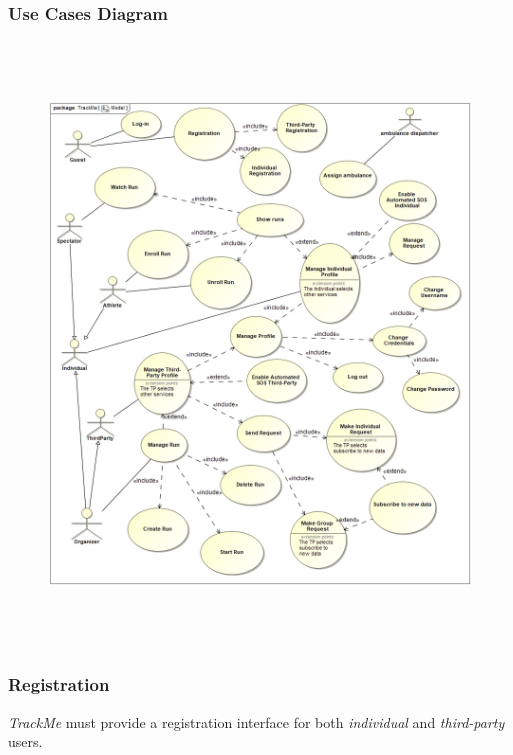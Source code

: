 \documentclass[a4paper]{article}
\begin{document}
        \subsubsection{Use Cases Diagram}
        \begin{figure}[!htpb]
    	\centering
    	\includegraphics[width=\textwidth,height=160mm]{images/UML/Model.jpg}
        \end{figure}
        \newpage
        \subsubsection{Registration}
        \textit{TrackMe} must provide a registration interface for both \textit{individual} and \textit{third-party} users.
        
\end{document}
